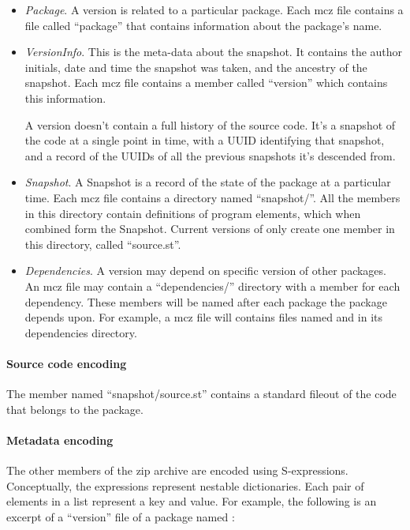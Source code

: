 \documentclass[a4paper,10pt,twoside]{book}
\begin{document}
\begin{itemize}
\item \emph{Package}. A version is related to a particular package. Each mcz file contains a file called ``package'' that contains information about the package's name.

\item \emph{VersionInfo}. This is the meta-data about the snapshot. It contains the author initials, date and time the snapshot was taken, and the ancestry of the snapshot. Each mcz file contains a member called ``version'' which contains this information.

A version doesn't contain a full history of the source code. It's a snapshot of the code at a single point in time, with a UUID identifying that snapshot, and a record of the UUIDs of all the previous snapshots it's descended from.

\item \emph{Snapshot}. A Snapshot is a record of the state of the package at a particular time. Each mcz file contains a directory named ``snapshot/''. All the members in this directory contain definitions of program elements, which when combined form the Snapshot. Current versions of \MC only create one member in this directory, called ``source.st''.
\item \emph{Dependencies}. A version may depend on specific version of other packages. An mcz file may contain a ``dependencies/'' directory with a member for each dependency. These members will be named after each package the \MC package depends upon. For example, a  mcz file will contains files named  and  in its dependencies directory.
\end{itemize}

\paragraph{Source code encoding}

The member named ``snapshot/source.st'' contains a standard fileout of the code that belongs to the package.

\paragraph{Metadata encoding}

The other members of the zip archive are encoded using S-expressions. Conceptually, the expressions represent nestable dictionaries. Each pair of elements in a list represent a key and value. For example, the following is an excerpt of a ``version'' file of a package named :
\end{document}
